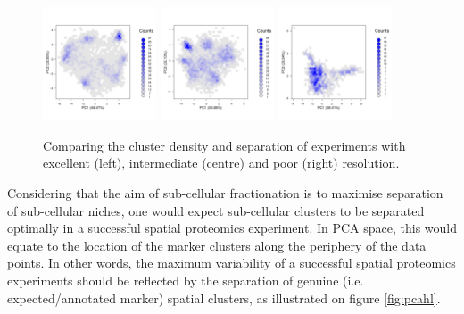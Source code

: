 \documentclass[12pt]{article}\usepackage[]{graphicx}\usepackage[]{color}
\begin{document}
\begin{figure}[ht]
  \centering
  \includegraphics[width = 0.3\textwidth]{./figure/hexbin-1.pdf}
  \includegraphics[width = 0.3\textwidth]{./figure/hexbin-2.pdf}
  \includegraphics[width = 0.3\textwidth]{./figure/hexbin-3.pdf}
  \caption{Comparing the cluster density and separation of experiments
    with excellent (left), intermediate (centre) and poor (right)
    resolution.}
  \label{fig:hexbin1}
\end{figure}

Considering that the aim of sub-cellular fractionation is to maximise
separation of sub-cellular niches, one would expect sub-cellular
clusters to be separated optimally in a successful spatial proteomics
experiment. In PCA space, this would equate to the location of the
marker clusters along the periphery of the data points. In other
words, the maximum variability of a successful spatial proteomics
experiments should be reflected by the separation of genuine
(i.e. expected/annotated marker) spatial clusters, as illustrated on
figure \ref{fig:pcahl}.
\end{document}
